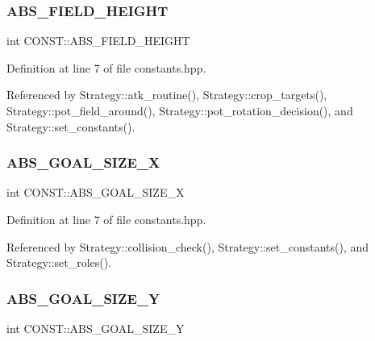 \subsubsection{\texorpdfstring{A\+B\+S\+\_\+\+F\+I\+E\+L\+D\+\_\+\+H\+E\+I\+G\+HT}{ABS\_FIELD\_HEIGHT}}
{\footnotesize\ttfamily int C\+O\+N\+S\+T\+::\+A\+B\+S\+\_\+\+F\+I\+E\+L\+D\+\_\+\+H\+E\+I\+G\+HT\hspace{0.3cm}{\ttfamily [static]}}



Definition at line 7 of file constants.\+hpp.



Referenced by Strategy\+::atk\+\_\+routine(), Strategy\+::crop\+\_\+targets(), Strategy\+::pot\+\_\+field\+\_\+around(), Strategy\+::pot\+\_\+rotation\+\_\+decision(), and Strategy\+::set\+\_\+constants().

\mbox{\label{namespace_c_o_n_s_t_a01f9b9486ce728d46c65c5d2fc2798d4}} 
\subsubsection{\texorpdfstring{A\+B\+S\+\_\+\+G\+O\+A\+L\+\_\+\+S\+I\+Z\+E\+\_\+X}{ABS\_GOAL\_SIZE\_X}}
{\footnotesize\ttfamily int C\+O\+N\+S\+T\+::\+A\+B\+S\+\_\+\+G\+O\+A\+L\+\_\+\+S\+I\+Z\+E\+\_\+X\hspace{0.3cm}{\ttfamily [static]}}



Definition at line 7 of file constants.\+hpp.



Referenced by Strategy\+::collision\+\_\+check(), Strategy\+::set\+\_\+constants(), and Strategy\+::set\+\_\+roles().

\mbox{\label{namespace_c_o_n_s_t_a5461381c3d71d5f77ef87d4e8c2b05df}} 
\subsubsection{\texorpdfstring{A\+B\+S\+\_\+\+G\+O\+A\+L\+\_\+\+S\+I\+Z\+E\+\_\+Y}{ABS\_GOAL\_SIZE\_Y}}
{\footnotesize\ttfamily int C\+O\+N\+S\+T\+::\+A\+B\+S\+\_\+\+G\+O\+A\+L\+\_\+\+S\+I\+Z\+E\+\_\+Y\hspace{0.3cm}{\ttfamily [static]}}



